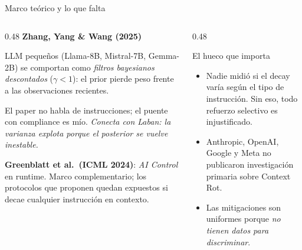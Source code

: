 \documentclass[aspectratio=169, 11pt]{beamer}
\begin{document}
\begin{frame}{Marco te\'orico y lo que falta}

\begin{columns}[T]
\begin{column}{0.48\textwidth}
\textbf{Zhang, Yang \& Wang (2025)}

\vspace{0.3em}
\footnotesize
LLM peque\~nos (Llama-8B, Mistral-7B, Gemma-2B) se comportan como \emph{filtros bayesianos descontados} ($\gamma < 1$): el prior pierde peso frente a las observaciones recientes.

\vspace{0.5em}

El paper no habla de instrucciones; el puente con compliance es m\'io. \emph{Conecta con Laban: la varianza explota porque el posterior se vuelve inestable.}

\vspace{0.7em}

\textbf{Greenblatt et al.\ (ICML 2024)}: \emph{AI Control} en runtime. Marco complementario; los protocolos que proponen quedan expuestos si decae cualquier instrucci\'on en contexto.
\end{column}

\begin{column}{0.48\textwidth}
\begin{block}{El hueco que importa}
\footnotesize
\begin{itemize}
    \item \alert{Nadie midi\'o si el decay var\'ia seg\'un el tipo de instrucci\'on.} Sin eso, todo refuerzo selectivo es injustificado.
    \item Anthropic, OpenAI, Google y Meta no publicaron investigaci\'on primaria sobre Context Rot.
    \item Las mitigaciones son uniformes porque \emph{no tienen datos para discriminar}.
\end{itemize}
\end{block}
\end{column}
\end{columns}

\end{frame}

\end{document}
